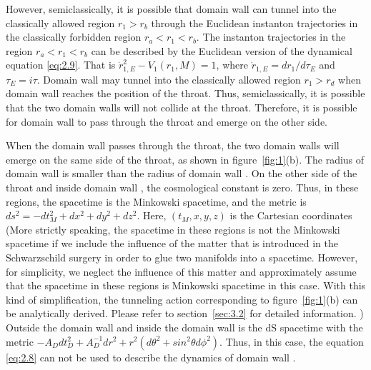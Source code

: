 \documentclass[12pt]{article}
\begin{document}
However, semiclassically,  it is  possible that domain wall \uppercase\expandafter{} can tunnel into the classically allowed region $r_{1}>r_{b}$  through the Euclidean instanton trajectories in the classically forbidden region $r_{a}<r_{1}<r_{b}$. The instanton trajectories in the region $r_{a}<r_{1}<r_{b}$ can be described by the Euclidean version of the dynamical equation \eqref{eq:2.9}. That is $\dot{r}_{1,E}^{2}-V_{1}(r_{1},M)=1$, where $\dot{r}_{1,E}=dr_{1}/d\tau_{E}$ and $\tau_{E}=i\tau$. Domain wall \uppercase\expandafter{} may  tunnel into the classically allowed region $r_{1}>r_{d}$ when domain wall \uppercase\expandafter{} reaches the position of the throat. Thus, semiclassically, it is possible that the two domain walls will not collide at the throat. Therefore, it is possible for domain wall \uppercase\expandafter{} to pass through the throat and emerge on the other side.

When the domain wall \uppercase\expandafter{} passes through the throat, the two domain walls will emerge on the same side of the throat, as shown in figure~\ref{fig:1}(b). The radius of domain wall \uppercase\expandafter{} is smaller than the radius of domain wall \uppercase\expandafter{}. On the other side of the throat and inside  domain wall \uppercase\expandafter{}, the cosmological constant is zero. Thus, in these regions, the spacetime is the Minkowski spacetime, and the metric is $ds^{2}=-dt_{M}^{2}+dx^{2}+dy^{2}+dz^{2}$. Here, $(t_{M}, x, y, z)$ is the Cartesian coordinates (More strictly speaking, the spacetime in these regions is not the Minkowski spacetime if we include the influence of the matter that is introduced in the Schwarzschild surgery in order to glue two manifolds into a spacetime. However, for simplicity, we neglect the influence of this matter and approximately assume that the spacetime in these regions is Minkowski spacetime in this case. With this kind of simplification, the tunneling action corresponding to figure~\ref{fig:1}(b) can be analytically derived. Please refer to section~\ref{sec:3.2} for detailed information. ) Outside the domain wall  \uppercase\expandafter{} and inside the domain wall  \uppercase\expandafter{} is the dS spacetime with the metric $-A_{D}dt_{D}^{2}+A_{D}^{-1}dr^{2}+r^{2}(d\theta^{2}+sin^{2} \theta d\phi^{2})$.  Thus, in this case, the equation \eqref{eq:2.8} can not be used to describe the dynamics of domain wall \uppercase\expandafter{}.
\end{document}
